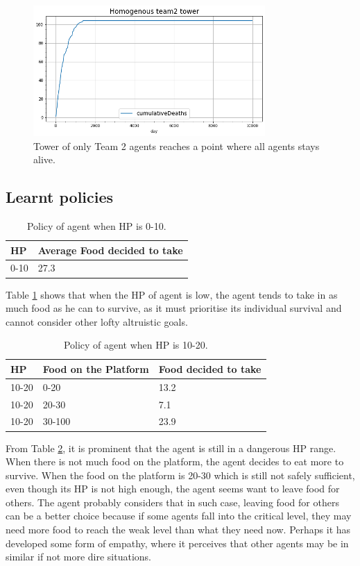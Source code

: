 \begin{figure}
\centering
\includegraphics{004_team_2_agent_design/252team2}
\caption{Tower of only Team 2 agents reaches a point where all agents stays alive.}
\label{252team2}
\end{figure}

\subsection{Learnt policies}
\begin{table}
\centering
\caption{Policy of agent when HP is 0-10.}
\label{lowhp-team2}
\begin{tabular}{@{}ll@{}}
\toprule
HP   & Average Food decided to take \\ \midrule
0-10 & 27.3                         \\ \bottomrule
\end{tabular}
\end{table}
Table \ref{lowhp-team2} shows that when the HP of agent is low, the agent tends to take in as much food as he can to survive, as it must prioritise its individual survival and cannot consider other lofty altruistic goals.

\begin{table}[]
\centering
\caption{Policy of agent when HP is 10-20.}
\label{midhp-team2}
\begin{tabular}{@{}lll@{}}
\toprule
HP    & Food on the Platform & Food decided to take \\ \midrule
10-20 & 0-20                 & 13.2                 \\
10-20 & 20-30                & 7.1                  \\
10-20 & 30-100               & 23.9                 \\ \bottomrule
\end{tabular}
\end{table}

From Table \ref{midhp-team2}, it is prominent that the agent is still in a dangerous HP range. When there is not much food on the platform, the agent decides to eat more to survive.
When the food on the platform is 20-30 which is still not safely sufficient, even though its HP is not high enough, the agent seems want to leave food for others. The agent probably considers that in such case, leaving food for others can be a better choice because if some agents fall into the critical level, they may need more food to reach the weak level than what they need now. Perhaps it has developed some form of empathy, where it perceives that other agents may be in similar if not more dire situations. 

